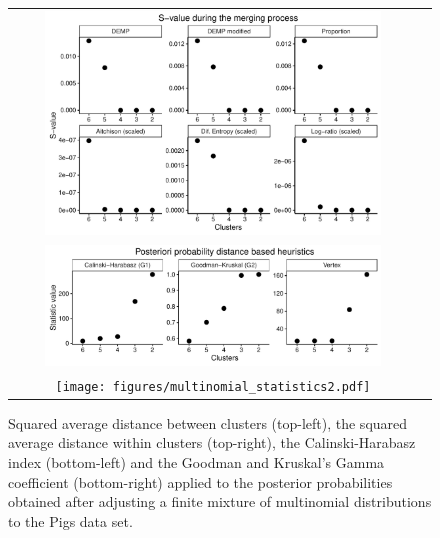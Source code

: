 \documentclass[submit]{smj}
\theoremstyle{definition}
\begin{document}
\begin{figure}[th]
\begin{center}
\begin{tabular}{cc}
  \includegraphics[width=0.85\textwidth]{figures/multinomial_Svalues_all.pdf} \\
  \includegraphics[width=0.85\textwidth]{figures/multinomial_statistics.pdf} \\
  \texttt{[image: figures/multinomial\_statistics2.pdf]} 
 \end{tabular}
 \caption{Squared average distance between clusters (top-left), the squared average distance within clusters (top-right), the Calinski-Harabasz index (bottom-left) and the Goodman and Kruskal's Gamma coefficient (bottom-right) applied to the posterior probabilities obtained after adjusting a finite mixture of multinomial distributions to the Pigs data set.}\label{multinomial_statistics}
\end{center}
\end{figure}
\end{document}
